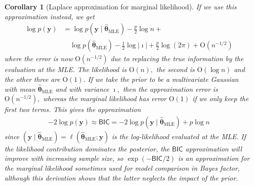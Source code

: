 \documentclass[
  11pt,
  letterpaper,
]{scrbook}
\theoremstyle{definition}
\theoremstyle{plain}
\theoremstyle{plain}
\theoremstyle{plain}
\newtheorem{corollary}{Corollary}[chapter]
\theoremstyle{definition}
\theoremstyle{definition}
\theoremstyle{plain}
\theoremstyle{plain}
\newtheorem{corollary}{Corollary}[chapter]
\theoremstyle{remark}
\begin{document}
\begin{corollary}[Laplace approximation for marginal
likelihood]
If we use this approximation instead, we get \begin{align*}
 \log p(\boldsymbol{y}) &= \log p(\boldsymbol{y} \mid \widehat{\boldsymbol{\theta}}_{\mathrm{MLE}}) -\frac{p}{2} \log n + \\& \quad  \log p(\widehat{\boldsymbol{\theta}}_{\mathrm{MLE}}) - \frac{1}{2} \log |\boldsymbol{\imath}| + \frac{p}{2} \log(2\pi)  + \mathrm{O}(n^{-1/2})
\end{align*} where the error is now \(\mathrm{O}(n^{-1/2})\) due to
replacing the true information by the evaluation at the MLE. The
likelihood is \(\mathrm{O}(n),\) the second is \(\mathrm{O}(\log n)\)
and the other three are \(\mathrm{O}(1).\) If we take the prior to be a
multivariate Gaussian with mean
\(\widehat{\boldsymbol{\theta}}_{\mathrm{MLE}}\) and with variance
\(\boldsymbol{\imath},\) then the approximation error is
\(\mathrm{O}(n^{-1/2}),\) whereas the marginal likelihood has error
\(\mathrm{O}(1)\) if we only keep the first two terms. This gives the
approximation \begin{align*}
-2\log p(\boldsymbol{y}) \approx \mathsf{BIC} = -2\log p(\boldsymbol{y} \mid \widehat{\boldsymbol{\theta}}_{\mathrm{MLE}}) + p\log n
\end{align*} since
\((\boldsymbol{y} \mid \widehat{\boldsymbol{\theta}}_{\mathrm{MLE}})=\ell( \widehat{\boldsymbol{\theta}}_{\mathrm{MLE}}; \boldsymbol{y})\)
is the log-likelihood evaluated at the MLE. If the likelihood
contribution dominates the posterior, the \(\mathsf{BIC}\) approximation
will improve with increasing sample size, so \(\exp(-\mathsf{BIC}/2)\)
is an approximation for the marginal likelihood sometimes used for model
comparison in Bayes factor, although this derivation shows that the
latter neglects the impact of the prior.

\end{corollary}
\end{document}
